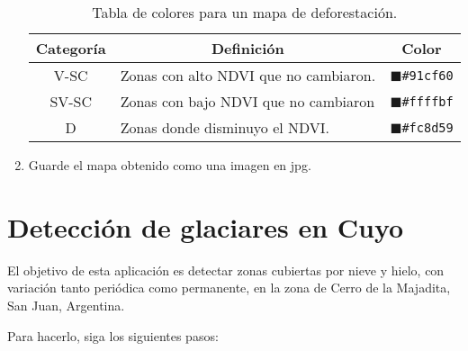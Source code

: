 \begin{enumerate}
\begin{table}[]
\centering
\begin{tabular}{@{}cll@{}}
\toprule
Categoría & \multicolumn{1}{c}{Definición}        & \multicolumn{1}{c}{Color}                       \\ \midrule
V-SC      & Zonas con alto NDVI que no cambiaron. & \textcolor{P1}{$\blacksquare$}\texttt{\#91cf60} \\
SV-SC     & Zonas con bajo NDVI que no cambiaron  & \textcolor{P2}{$\blacksquare$}\texttt{\#ffffbf} \\
D         & Zonas donde disminuyo el NDVI.        & \textcolor{P3}{$\blacksquare$}\texttt{\#fc8d59} \\ \bottomrule
\end{tabular}
\caption{Tabla de colores para un mapa de deforestación.}
\label{tab:def}
\end{table}

\item Guarde el mapa obtenido como una imagen en jpg.

\end{enumerate}

\section{Detección de glaciares en Cuyo}

El objetivo de esta aplicación es detectar zonas cubiertas por nieve y hielo, con variación tanto periódica como permanente, en la zona de Cerro de la Majadita, San Juan, Argentina.

Para hacerlo, siga los siguientes pasos:


